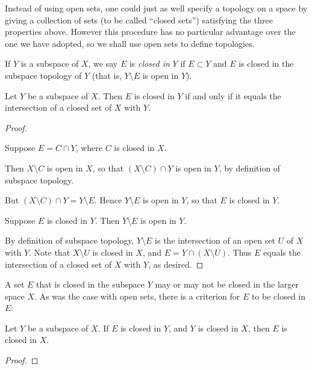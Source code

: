\begin{remark}
Instead of using open sets, one could just as well specify a topology on a space by giving a collection of sets (to be called ``closed sets'') satisfying the three properties above. 
However this procedure has no particular advantage over the one we have adopted, so we shall use open sets to define topologies.
\end{remark}

If $Y$ is a subspace of $X$, we say $E$ is \emph{closed in} $Y$ if $E\subset Y$ and $E$ is closed in the subspace topology of $Y$ (that is, $Y\setminus E$ is open in $Y$).

\begin{proposition}
Let $Y$ be a subspace of $X$. Then $E$ is closed in $Y$ if and only if it equals the intersection of a closed set of $X$ with $Y$.
\end{proposition}

\begin{proof} \

\fbox{$\impliedby$} Suppose $E=C\cap Y$, where $C$ is closed in $X$.

Then $X\setminus C$ is open in $X$, so that $(X\setminus C)\cap Y$ is open in $Y$, by definition of subspace topology.

But $(X\setminus C)\cap Y=Y\setminus E$. Hence $Y\setminus E$ is open in $Y$, so that $E$ is closed in $Y$.

\fbox{$\implies$} Suppose $E$ is closed in $Y$. Then $Y\setminus E$ is open in $Y$.

By definition of subspace topology, $Y\setminus E$ is the intersection of an open set $U$ of $X$ with $Y$. Note that $X\setminus U$ is closed in $X$, and $E=Y\cap(X\setminus U)$. 
Thus $E$ equals the intersection of a closed set of $X$ with $Y$, as desired.
\end{proof}

A set $E$ that is closed in the subspace $Y$ may or may not be closed in the larger space $X$. As was the case with open sets, there is a criterion for $E$ to be closed in $E$:

\begin{proposition}
Let $Y$ be a subspace of $X$. If $E$ is closed in $Y$, and $Y$ is closed in $X$, then $E$ is closed in $X$.
\end{proposition}

\begin{proof}

\end{proof}
\pagebreak

